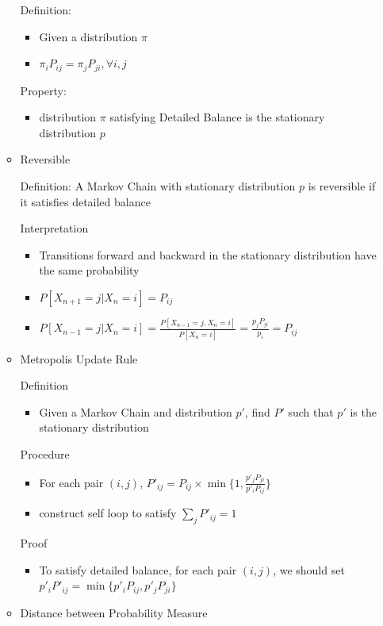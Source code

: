 \documentclass[a4paper]{article}
\begin{document}
\begin{itemize}
\begin{itemize}
                Definition:
                \begin{itemize}
                    \item Given a distribution $\pi$
                    \item $\pi_i P_{ij} = \pi_j P_{ji}, \forall i, j$
                \end{itemize}
                Property: 
                \begin{itemize}
                    \item distribution $\pi$ satisfying Detailed Balance is the stationary distribution $p$
                \end{itemize}
            \item Reversible

                Definition: A Markov Chain with stationary distribution $p$ is reversible if it satisfies detailed balance

                Interpretation
                \begin{itemize}
                    \item Transitions forward and backward in the stationary distribution have the same probability
                    \item $P[X_{n+1} = j| X_n = i] = P_{ij}$
                    \item $P[X_{n-1} = j| X_n = i] = \frac{P[X_{n-1} = j, X_n = i]}{P[X_n = i]} = \frac{p_j P_{ji}}{p_i} = P_{ij}$
                \end{itemize}
            \item Metropolis Update Rule

                Definition
                \begin{itemize}
                    \item Given a Markov Chain and distribution $p'$, find $P'$ such that $p'$ is the stationary distribution
                \end{itemize}
                Procedure
                \begin{itemize}
                    \item For each pair $(i,j)$, $P'_{ij} = P_{ij} \times \min\{1, \frac{p'_j P_{ji}}{p'_i P_{ij}} \}$
                    \item construct self loop to satisfy $\sum_j P'_{ij} = 1$
                \end{itemize}
                Proof
                \begin{itemize}
                    \item To satisfy detailed balance, for each pair $(i, j)$, we should set $p'_i P'_{ij} = \min\{p'_i P_{ij}, p'_j P_{ji}\}$ 
                \end{itemize}
            \item Distance between Probability Measure
                

\end{itemize}
\end{itemize}
\end{document}
